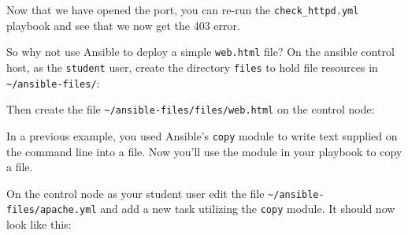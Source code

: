 Now that we have opened the port, you can re-run the \texttt{check\_httpd.yml} playbook and see that we now get the 403 error.

So why not use Ansible to deploy a simple \texttt{web.html} file? On the
ansible control host, as the \texttt{student} user, create the directory
\texttt{files} to hold file resources in
\texttt{\textasciitilde{}/ansible-files/}:

\begin{Shaded}
\begin{Highlighting}[]
\ExtensionTok{[student@controller}\NormalTok{ ansible{-}files]$ mkdir files}
\end{Highlighting}
\end{Shaded}

Then create the file
\texttt{\textasciitilde{}/ansible-files/files/web.html} on the control
node:

\begin{Shaded}
\begin{Highlighting}[]
\DataTypeTok{\textless{}}\DataTypeTok{\textgreater{}}
\DataTypeTok{  \textless{}}\DataTypeTok{\textgreater{}}\DataTypeTok{\textless{}/}\DataTypeTok{\textgreater{}}
\DataTypeTok{\textless{}/}\DataTypeTok{\textgreater{}}
\end{Highlighting}
\end{Shaded}

In a previous example, you used Ansible's \texttt{copy} module to write
text supplied on the command line into a file. Now you'll use the module
in your playbook to copy a file.

On the control node as your student user edit the file
\texttt{\textasciitilde{}/ansible-files/apache.yml} and add a new task
utilizing the \texttt{copy} module. It should now look like this:

